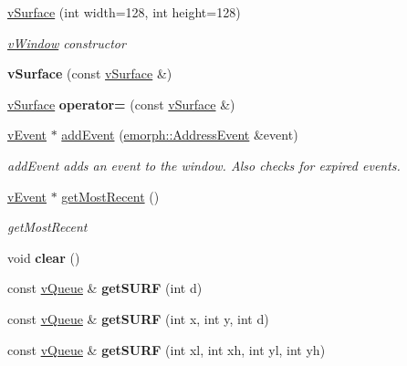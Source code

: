 \begin{DoxyCompactItemize}
\item 
\hyperlink{classemorph_1_1vSurface_a7cd409f3b050a8cfbf9293284741eb6f}{v\-Surface} (int width=128, int height=128)
\begin{DoxyCompactList}\small\item\em \hyperlink{classemorph_1_1vWindow}{v\-Window} constructor \end{DoxyCompactList}\item 
\hypertarget{classemorph_1_1vSurface_a16d06483fa8a093bc1676c97deb9a074}{{\bfseries v\-Surface} (const \hyperlink{classemorph_1_1vSurface}{v\-Surface} \&)}\label{classemorph_1_1vSurface_a16d06483fa8a093bc1676c97deb9a074}

\item 
\hypertarget{classemorph_1_1vSurface_ad5f34493d533520c6913f9b938bc1f62}{\hyperlink{classemorph_1_1vSurface}{v\-Surface} {\bfseries operator=} (const \hyperlink{classemorph_1_1vSurface}{v\-Surface} \&)}\label{classemorph_1_1vSurface_ad5f34493d533520c6913f9b938bc1f62}

\item 
\hyperlink{classemorph_1_1vEvent}{v\-Event} $\ast$ \hyperlink{classemorph_1_1vSurface_aeb801c9d1a4b5c801b389a7f9ef9b82d}{add\-Event} (\hyperlink{classemorph_1_1AddressEvent}{emorph\-::\-Address\-Event} \&event)
\begin{DoxyCompactList}\small\item\em add\-Event adds an event to the window. Also checks for expired events. \end{DoxyCompactList}\item 
\hyperlink{classemorph_1_1vEvent}{v\-Event} $\ast$ \hyperlink{classemorph_1_1vSurface_ad348c7b75c0cb7530af3835021ef101e}{get\-Most\-Recent} ()
\begin{DoxyCompactList}\small\item\em get\-Most\-Recent \end{DoxyCompactList}\item 
\hypertarget{classemorph_1_1vSurface_a51d798ee57bbd56df9644b9dacd7e4b7}{void {\bfseries clear} ()}\label{classemorph_1_1vSurface_a51d798ee57bbd56df9644b9dacd7e4b7}

\item 
\hypertarget{classemorph_1_1vSurface_af7b1bfed295daca8e16ec4f563470b54}{const \hyperlink{classemorph_1_1vQueue}{v\-Queue} \& {\bfseries get\-S\-U\-R\-F} (int d)}\label{classemorph_1_1vSurface_af7b1bfed295daca8e16ec4f563470b54}

\item 
\hypertarget{classemorph_1_1vSurface_ae0095a43c5848a2fa8602aa5f9ad2040}{const \hyperlink{classemorph_1_1vQueue}{v\-Queue} \& {\bfseries get\-S\-U\-R\-F} (int x, int y, int d)}\label{classemorph_1_1vSurface_ae0095a43c5848a2fa8602aa5f9ad2040}

\item 
\hypertarget{classemorph_1_1vSurface_ad4b09e955e93cad783cd1fa137cfcb73}{const \hyperlink{classemorph_1_1vQueue}{v\-Queue} \& {\bfseries get\-S\-U\-R\-F} (int xl, int xh, int yl, int yh)}\label{classemorph_1_1vSurface_ad4b09e955e93cad783cd1fa137cfcb73}

\end{DoxyCompactItemize}



